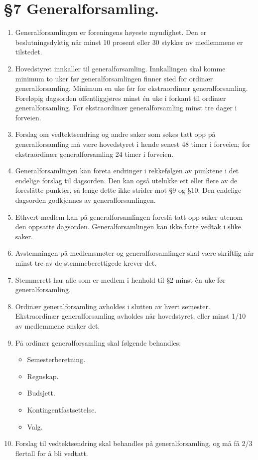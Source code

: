 \documentclass[10pt,norsk,a4paper]{article}
\begin{document}
\section*{§7 Generalforsamling.}
\begin{enumerate}
	\item{Generalforsamlingen er foreningens høyeste myndighet. Den er beslutningsdyktig når minst 10 prosent eller 30 stykker av medlemmene er tilstedet.}
	\item{Hovedstyret innkaller til generalforsamling. Innkallingen skal komme minimum to uker før generalforsamlingen finner sted for ordinær generalforsamling. Minimum en uke før for ekstraordinær generalforsamling. Foreløpig dagsorden offentliggjøres minst én uke i forkant til ordinær generalforsamling. For ekstraordinær generalforsamling minst tre dager i forveien.}
	\item{Forslag om vedtektsendring og andre saker som søkes tatt opp på generalforsamling må være hovedstyret i hende senest 48 timer i forveien; for ekstraordinær generalforsamling 24 timer i forveien.}
	\item{Generalforsamlingen kan foreta endringer i rekkefølgen av punktene i det endelige forslag til dagsorden. Den kan også utelukke ett eller flere av de foreslåtte punkter, så lenge dette ikke strider mot §9 og §10. Den endelige dagsorden godkjennes av generalforsamlingen.}
	\item{Ethvert medlem kan på generalforsamlingen foreslå tatt opp saker utenom den oppsatte dagsorden. Generalforsamlingen kan ikke fatte vedtak i slike saker.}
	\item{Avstemningen på medlemsmøter og generalforsamlinger skal være skriftlig når minst tre av de stemmeberettigede krever det.}
        \item{Stemmerett har alle som er medlem i henhold til §2 minst èn uke før generalforsamling.}
	\item{Ordinær generalforsamling avholdes i slutten av hvert semester. Ekstraordinær generalforsamling avholdes når hovedstyret, eller minst 1/10 av medlemmene ønsker det.}
	\item{På ordinær generalforsamling skal følgende behandles:}
	\begin{itemize}
		\item{Semesterberetning.}
		\item{Regnskap.}
		\item{Budsjett.}
		\item{Kontingentfastsettelse.}
		\item{Valg.}
	\end{itemize}
	\item{Forslag til vedtektsendring skal behandles på generalforsamling, og må få 2/3 flertall for å bli vedtatt.}
\end{enumerate}
\end{document}
